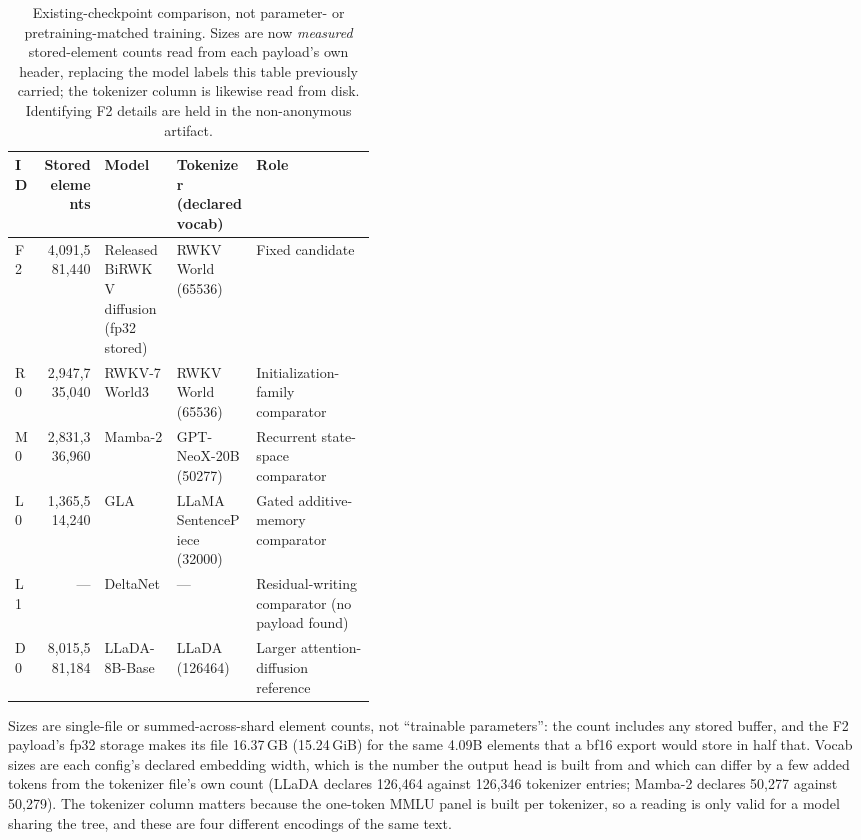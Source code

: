 \begin{table}[t]
\centering\small
\caption{Existing-checkpoint comparison, not parameter- or pretraining-matched training. Sizes are now \emph{measured} stored-element counts read from each payload's own header, replacing the model labels this table previously carried; the tokenizer column is likewise read from disk. Identifying F2 details are held in the non-anonymous artifact.}
\begin{tabularx}{\linewidth}{@{}lrp{0.20\linewidth}p{0.22\linewidth}Y@{}}
\toprule
ID & Stored elements & Model & Tokenizer (declared vocab) & Role\\
\midrule
F2 & 4{,}091{,}581{,}440 & Released BiRWKV diffusion (fp32 stored) & RWKV World (65536) & Fixed candidate\\
R0 & 2{,}947{,}735{,}040 & RWKV-7 World3 & RWKV World (65536) & Initialization-family comparator\\
M0 & 2{,}831{,}336{,}960 & Mamba-2 & GPT-NeoX-20B (50277) & Recurrent state-space comparator\\
L0 & 1{,}365{,}514{,}240 & GLA & LLaMA SentencePiece (32000) & Gated additive-memory comparator\\
L1 & --- & DeltaNet & --- & Residual-writing comparator (no payload found)\\
D0 & 8{,}015{,}581{,}184 & LLaDA-8B-Base & LLaDA (126464) & Larger attention-diffusion reference\\
\bottomrule
\end{tabularx}
\label{m:arms}
\end{table}

Sizes are single-file or summed-across-shard element counts, not ``trainable parameters'': the count includes any stored buffer, and the F2 payload's fp32 storage makes its file 16.37\,GB (15.24\,GiB) for the same 4.09B elements that a bf16 export would store in half that. Vocab sizes are each config's declared embedding width, which is the number the output head is built from and which can differ by a few added tokens from the tokenizer file's own count (LLaDA declares 126{,}464 against 126{,}346 tokenizer entries; Mamba-2 declares 50{,}277 against 50{,}279). The tokenizer column matters because the one-token MMLU panel is built per tokenizer, so a reading is only valid for a model sharing the tree, and these are four different encodings of the same text.

